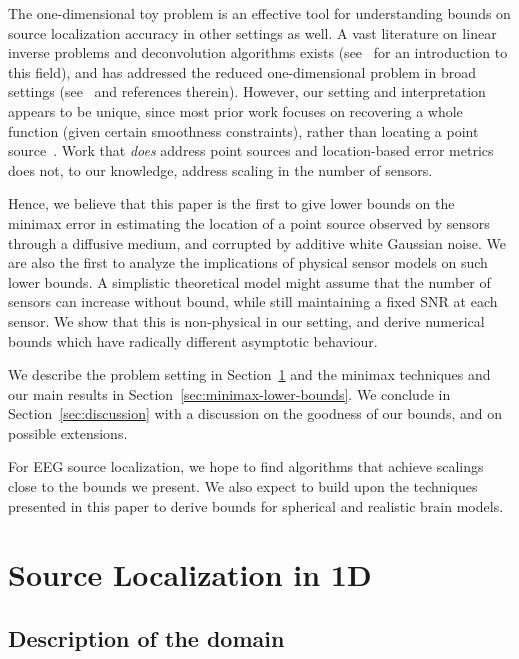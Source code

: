 \documentclass[conference,letterpaper]{IEEEtran}
\begin{document}
The one-dimensional toy problem is an effective tool for understanding bounds
on source localization accuracy in other settings as well. A vast literature on
linear inverse problems and deconvolution algorithms exists
(see~\cite{Bal2012Introduction} for an introduction to this field), and has
addressed the reduced one-dimensional problem in broad settings
(see~\cite{Cavalier2002Sharp,Efromovich1997Robust,Ibragimov1981Statistical} and
references therein). However, our setting and interpretation appears to be
unique, since most prior work focuses on recovering a whole function (given
certain smoothness constraints), rather than locating a point
source~\cite{Cavalier2002Sharp}. Work that \emph{does} address point sources
and location-based error metrics~\cite[Ch.~7, Sec.~2]{Ibragimov1981Statistical}
does not, to our knowledge, address scaling in the number of sensors.

Hence, we believe that this paper is the first to give lower bounds on the
minimax error in estimating the location of a point source observed by sensors
through a diffusive medium, and corrupted by additive white Gaussian noise. We
are also the first to analyze the implications of physical sensor models on
such lower bounds. A simplistic theoretical model might assume that the number
of sensors can increase without bound, while still maintaining a fixed SNR at
each sensor. We show that this is non-physical in our setting, and derive
numerical bounds which have radically different asymptotic behaviour.

We describe the problem setting in Section~\ref{sec:source-localization} and
the minimax techniques and our main results in
Section~\ref{sec:minimax-lower-bounds}. We conclude in
Section~\ref{sec:discussion} with a discussion on the goodness of our bounds,
and on possible extensions.

For EEG source localization, we hope to find algorithms that achieve scalings
close to the bounds we present.  We also expect to build upon the techniques
presented in this paper to derive bounds for spherical and realistic brain
models.

\section{Source Localization in 1D}
\label{sec:source-localization}

\subsection{Description of the domain}
\end{document}
